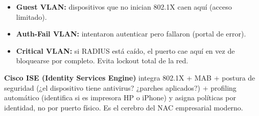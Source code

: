 \begin{itemize}
    \item \textbf{Guest VLAN:} dispositivos que no inician 802.1X caen aquí (acceso limitado).
    \item \textbf{Auth-Fail VLAN:} intentaron autenticar pero fallaron (portal de error).
    \item \textbf{Critical VLAN:} si RADIUS está caído, el puerto cae aquí en vez de
          bloquearse por completo. Evita lockout total de la red.
\end{itemize}

\begin{moderno}
 \textbf{Cisco ISE (Identity Services Engine)} integra 802.1X + MAB +
postura de seguridad (¿el dispositivo tiene antivirus? ¿parches aplicados?) + profiling
automático (identifica si es impresora HP o iPhone) y asigna políticas por identidad,
no por puerto físico. Es el cerebro del NAC empresarial moderno.
\end{moderno}
